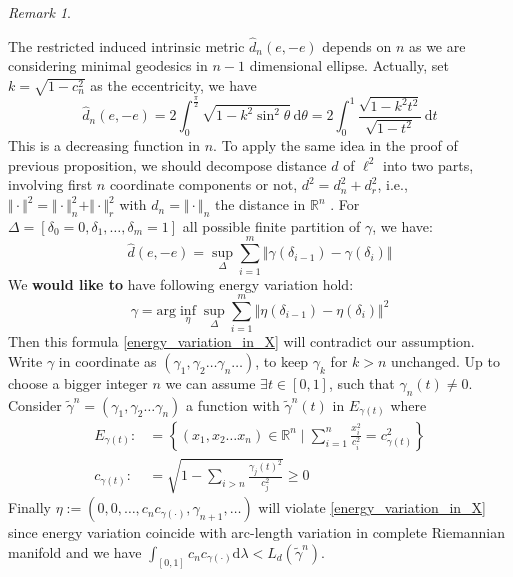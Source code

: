 \documentclass{report}
\theoremstyle{remark}
\newtheorem{rmk}{Remark}
\theoremstyle{definition}
\newcommand{\diff}{\mathrm{d}}
\begin{document}
\begin{rmk}
\begin{enumerate}
		      The restricted induced intrinsic metric $\hat{d}_n(e,-e)$ depends on $n$ as we are considering minimal geodesics in $n-1$ dimensional ellipse. Actually, set $k=\sqrt{1-c_n^2}$ as the eccentricity, we have
		      \[
			      \hat{d}_n(e,-e)= 2\int _{0}^{\tfrac {\pi }{2}}{\sqrt {1-k^{2}\sin ^{2}\theta }}\,\mathrm {d} \theta = 2\int _{0}^{1}{\frac {\sqrt {1-k^{2}t^{2}}}{\sqrt {1-t^{2}}}}\,\mathrm {d} t
		      \]
		      This is a decreasing function in $n$.	To apply the same idea in the proof of previous proposition, we should decompose distance $d$ of $\ell^2$ into two parts, involving first $n$ coordinate components or not, $d^2=d_n^2+d_r^2$, i.e., $\Vert \cdot \Vert^2 = \Vert \cdot \Vert_n^2 + \Vert \cdot \Vert_r^2$ with $d_n=\Vert \cdot \Vert_n$ the distance in $\mathbb{R} ^n $ . For $\Delta=[\delta_0=0,\delta_1, \ldots, \delta_m=1]$ all possible finite partition of $\gamma$, we have:
		      \[
			      \hat{d}(e,-e)=\sup_{\Delta} \sum_{i=1}^{m} \Vert\gamma(\delta_{i-1}) - \gamma(\delta_{i})\Vert
		      \]
		      We \textbf{would like to} have following energy variation hold:
		      \begin{equation}
			      \label{energy_variation_in_X}
			      \gamma = \mathrm{arg} \inf_{\eta} \sup_{\Delta} \sum_{i=1}^{m} \Vert\eta(\delta_{i-1})- \eta(\delta_{i})\Vert^2
		      \end{equation}
		      Then this formula \ref{energy_variation_in_X} will contradict our assumption. Write $\gamma$ in coordinate as $(\gamma_1, \gamma_2\ldots\gamma_n\ldots)$, to keep $\gamma_k$ for $ k > n$ unchanged. Up to choose a bigger integer $n$ we can assume $ \exists t \in [0,1]$, such that $\gamma_n(t) \neq 0$. Consider $\tilde{\gamma}^n = (\gamma_1, \gamma_2 \ldots \gamma_n)$ a function with $\tilde\gamma^n(t)$ in $E_{\gamma(t)}$ where
		      \begin{align*}
			      E_{\gamma(t)} : & = \left\{ (x_1,x_2 \ldots x_n) \in \mathbb{R}^n \mid \sum_{i=1}^n \frac{x_i^2}{ c_i^2} = c_{\gamma(t)}^2\right\} \\
			      c_{\gamma(t)}:  & =\sqrt{ 1- \sum_{i > n} \frac{\gamma_j(t)^2}{c_j^2}} \geq 0
		      \end{align*}
		      Finally $\eta := (0,0,\ldots, c_n c_{\gamma(\cdot)},\gamma_{n+1},\ldots)$ will violate \ref{energy_variation_in_X} since energy variation coincide with arc-length variation in complete Riemannian manifold and we have $\int_{[0,1]} c_n c_{\gamma(\cdot)} \diff \lambda < L_d(\tilde{\gamma}^n)$.

\end{enumerate}
\end{rmk}
\end{document}
